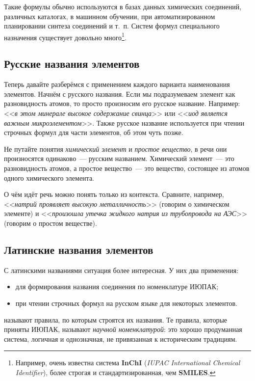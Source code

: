 Такие формулы обычно используются в базах данных химических соединений, различных каталогах, в машинном обучении, при автоматизированном планировании синтеза соединений и т.~п. Систем формул специального назначения существует довольно много\footnote{Например, очень известна система \textbf{InChI} (\textit{IUPAC International Chemical Identifier}), более строгая и стандартизированная, чем \textbf{SMILES}.}.

\subsection*{Русские названия элементов}

Теперь давайте разберёмся с применением каждого варианта наименования элементов. Начнём с русского названия. Если мы подразумеваем элемент как разновидность атомов, то просто произносим его русское название. Например: <<\emph{в этом минерале высокое содержание свинца}>> или <<\emph{иод является важным микроэлементом}>>. Также русское название используется при чтении строчных формул для части элементов, об этом чуть позже.

Не путайте понятия \emph{химический элемент} и \emph{простое вещество}, в речи они произносятся одинаково~--- русским названием. Химический элемент~--- это разновидность атомов, а простое вещество~--- это вещество, состоящее из атомов одного химического элемента.

О чём идёт речь можно понять только из контекста. Сравните, например, <<\emph{натрий проявляет высокую металличность}>> (говорим о химическом элементе) и <<\emph{произошла утечка жидкого натрия из трубопровода на АЭС}>> (говорим о простом веществе).

\subsection*{Латинские названия элементов}

С латинскими названиями ситуация более интересная. У них два применения:

\begin{itemize}
    \item для формирования названия соединения по номенклатуре ИЮПАК;
    \item при чтении строчных формул на русском языке для некоторых элементов.
\end{itemize}

 называют правила, по которым строятся их названия. Те правила, которые приняты ИЮПАК, называют \emph{научной номенклатурой}: это хорошо продуманная система, логичная и однозначная, не привязанная к историческим традициям.

